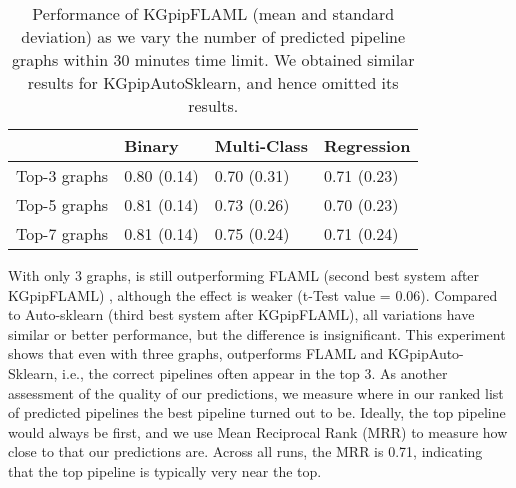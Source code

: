 \begin{table}[t]
\ncp\ncp\ncp
\caption{Performance of KGpipFLAML (mean and standard deviation) as we vary the number of predicted pipeline graphs within 30 minutes time limit. We obtained similar results for KGpipAutoSklearn, and hence omitted its results.}
\ncp\ncp\ncp
\begin{tabular}{llll}
\toprule
             & Binary  & Multi-Class  & Regression \\
\midrule
Top-3 graphs &     0.80 (0.14)                  &       0.70 (0.31)                     &    0.71 (0.23)        \\
Top-5 graphs &       0.81 (0.14)                &     0.73 (0.26)                       &      0.70 (0.23)      \\
Top-7 graphs &      0.81 (0.14)                 &    0.75 (0.24)                        &   0.71 (0.24) \\
\bottomrule
\end{tabular}
\label{tab_top_graphs}
\ncp\ncp\ncp\ncp\ncp\ncp
\end{table}

With only 3 graphs, {\sysname} is still outperforming FLAML (second best system after KGpipFLAML) , although the effect is weaker (t-Test value = 0.06). Compared to Auto-sklearn (third best system after KGpipFLAML), all variations have similar or better performance, but the difference is insignificant. 
This experiment shows that even with three graphs, {\sysname} outperforms FLAML and KGpipAuto-Sklearn, i.e., the correct pipelines often appear in the top 3. As another assessment of the quality of our predictions, we measure where in our ranked list of predicted pipelines the best pipeline turned out to be.  Ideally, the top pipeline would always be first, and we use Mean Reciprocal Rank (MRR) to measure how close to that our predictions are.  Across all runs, the MRR is 0.71, indicating that the top pipeline is typically very near the top.

